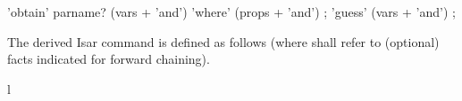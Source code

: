 \begin{isabellebody}
\begin{isamarkuptext}
  \begin{rail}
    'obtain' parname? (vars + 'and') 'where' (props + 'and')
    ;
    'guess' (vars + 'and')
    ;
  \end{rail}

  The derived Isar command \mbox{} is defined as follows
  (where  shall refer to (optional)
  facts indicated for forward chaining).
  \begin{matharray}{l}
    ~~\mbox{}~ \\[1ex]
    \quad \mbox{}~ \\
    \quad \mbox{}~ \\
    \qquad \mbox{}~ \\
    \qquad \mbox{}~ \\
    \qquad \mbox{}~\mbox{}~ \\
    \quad\qquad \mbox{}~\isa{{\isacharminus}} \\
    \quad\qquad \mbox{}~ \\
    \quad \mbox{} \\
    \quad \mbox{}~~\mbox{} \\
  \end{matharray}


\end{isamarkuptext}
\end{isabellebody}
